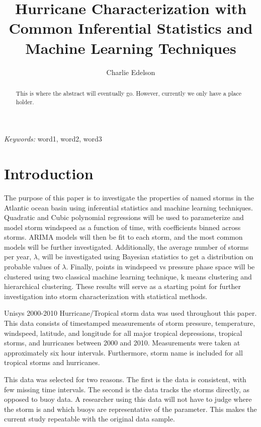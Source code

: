 \documentclass{article}
\title{Hurricane Characterization with Common Inferential Statistics and Machine Learning Techniques}
\author{Charlie Edelson}
\date{}
\providecommand{\keywords}[1]{\small{\textit{Keywords:} #1}}
\begin{document}
	
	\maketitle

	\begin{abstract}
	This is where the abstract will eventually go. However, currently we only have a place holder.
	\end{abstract}
	
	\keywords{word1, word2, word3}

	\section{Introduction}
	The purpose of this paper is to investigate the properties of named storms in the Atlantic ocean basin using inferential 
statistics and machine learning techniques. Quadratic and Cubic polynomial regressions will be used to parameterize and model storm 
windspeed as a function of time, with coefficients binned across storms. ARIMA models will then be fit to each storm, and the most common 
models will be further investigated. Additionally, the average number of storms per year, $\lambda$, will be investigated using Bayesian 
statistics to get a distribution on probable values of $\lambda$. Finally, points in windspeed vs pressure phase space will be clustered 
using two classical machine learning technique, k means clustering and hierarchical clustering. These results will serve as a starting point for further investigation into storm characterization with statistical methods.

	Unisys 2000-2010 Hurricane/Tropical storm data was used throughout this paper\cite{Unisys}. This data consists of timestamped 
measurements of storm pressure, temperature, windspeed, latitude, and longitude for all major tropical depressions, tropical storms, and 
hurricanes between 2000 and 2010. Measurements were taken at approximately six hour intervals. Furthermore, storm name is included for all 
tropical storms and hurricanes.

	This data was selected for two reasons. The first is the data is consistent, with few missing time intervals. The second is the 
data tracks the storms directly, as opposed to buoy data. A researcher using this data will not have to judge where the storm is and which 
buoys are representative of the parameter. This makes the current study repeatable with the original data sample.
\end{document}
